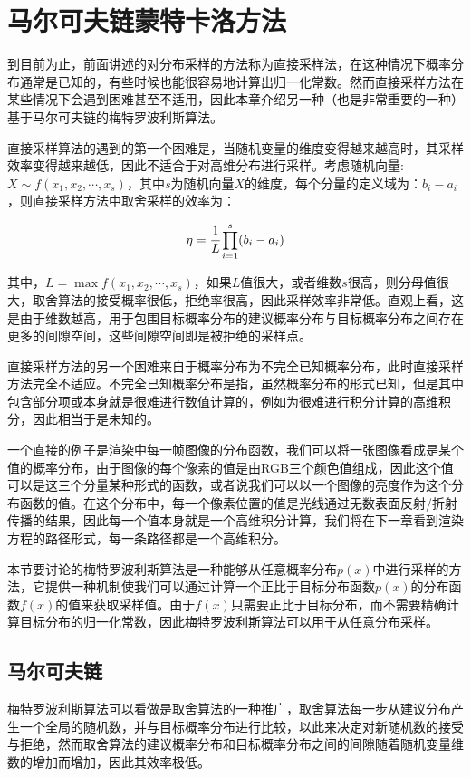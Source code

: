 \section{马尔可夫链蒙特卡洛方法}
到目前为止，前面讲述的对分布采样的方法称为直接采样法，在这种情况下概率分布通常是已知的，有些时候也能很容易地计算出归一化常数。然而直接采样方法在某些情况下会遇到困难甚至不适用，因此本章介绍另一种（也是非常重要的一种）基于马尔可夫链的梅特罗波利斯算法。

直接采样算法的遇到的第一个困难是，当随机变量的维度变得越来越高时，其采样效率变得越来越低，因此不适合于对高维分布进行采样。考虑随机向量: $X\sim f(x_1,x_2,\cdots,x_s )$，其中$s$为随机向量$X$的维度，每个分量的定义域为：$b_i-a_i$，则直接采样方法中取舍采样的效率为：

\begin{equation}
	\eta= \cfrac{1}{L}\prod^{s}_{i=1}(b_i-a_i)
\end{equation}

\noindent 其中，$L=\max{f(x_1,x_2,\cdots,x_s)}$，如果$L$值很大，或者维数$s$很高，则分母值很大，取舍算法的接受概率很低，拒绝率很高，因此采样效率非常低。直观上看，这是由于维数越高，用于包围目标概率分布的建议概率分布与目标概率分布之间存在更多的间隙空间，这些间隙空间即是被拒绝的采样点。

直接采样方法的另一个困难来自于概率分布为不完全已知概率分布，此时直接采样方法完全不适应。不完全已知概率分布是指，虽然概率分布的形式已知，但是其中包含部分项或本身就是很难进行数值计算的，例如为很难进行积分计算的高维积分，因此相当于是未知的。

一个直接的例子是渲染中每一帧图像的分布函数，我们可以将一张图像看成是某个值的概率分布，由于图像的每个像素的值是由RGB三个颜色值组成，因此这个值可以是这三个分量某种形式的函数，或者说我们可以以一个图像的亮度作为这个分布函数的值。在这个分布中，每一个像素位置的值是光线通过无数表面反射/折射传播的结果，因此每一个值本身就是一个高维积分计算，我们将在下一章看到渲染方程的路径形式，每一条路径都是一个高维积分。

本节要讨论的梅特罗波利斯算法是一种能够从任意概率分布$p(x)$中进行采样的方法，它提供一种机制使我们可以通过计算一个正比于目标分布函数$p(x)$的分布函数$f(x)$的值来获取采样值。由于$f(x)$只需要正比于目标分布，而不需要精确计算目标分布的归一化常数，因此梅特罗波利斯算法可以用于从任意分布采样。





\subsection{马尔可夫链}
梅特罗波利斯算法可以看做是取舍算法的一种推广，取舍算法每一步从建议分布产生一个全局的随机数，并与目标概率分布进行比较，以此来决定对新随机数的接受与拒绝，然而取舍算法的建议概率分布和目标概率分布之间的间隙随着随机变量维数的增加而增加，因此其效率极低。

